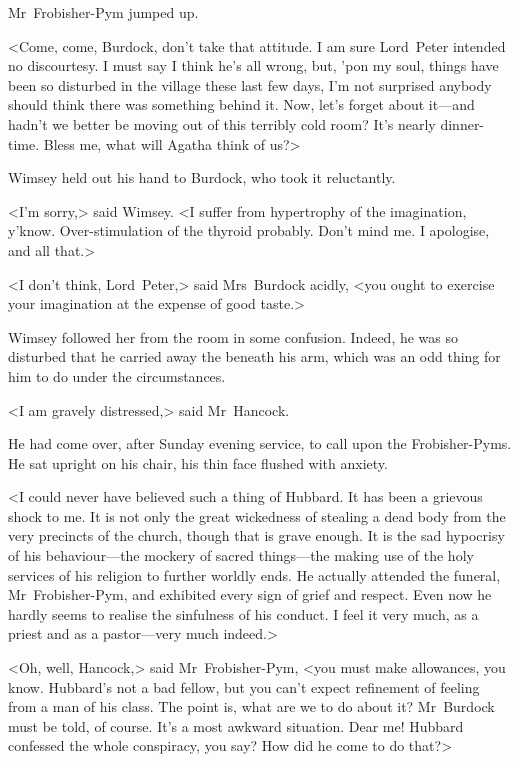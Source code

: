 Mr~Frobisher-Pym jumped up.

<Come, come, Burdock, don't take that attitude. I am sure Lord~Peter intended no discourtesy. I must say I think he's all wrong, but, 'pon my soul, things have been so disturbed in the village these last few days, I'm not surprised anybody should think there was something behind it. Now, let's forget about it—and hadn't we better be moving out of this terribly cold room? It's nearly dinner-time. Bless me, what will Agatha think of us?>

Wimsey held out his hand to Burdock, who took it reluctantly.

<I'm sorry,> said Wimsey. <I suffer from hypertrophy of the imagination, y'know. Over-stimulation of the thyroid probably. Don't mind me. I apologise, and all that.>

<I don't think, Lord~Peter,> said Mrs~Burdock acidly, <you ought to exercise your imagination at the expense of good taste.>

Wimsey followed her from the room in some confusion. Indeed, he was so disturbed that he carried away the  beneath his arm, which was an odd thing for him to do under the circumstances.

\divider
<I am gravely distressed,> said Mr~Hancock.

He had come over, after Sunday evening service, to call upon the Frobisher-Pyms. He sat upright on his chair, his thin face flushed with anxiety.

<I could never have believed such a thing of Hubbard. It has been a grievous shock to me. It is not only the great wickedness of stealing a dead body from the very precincts of the church, though that is grave enough. It is the sad hypocrisy of his behaviour—the mockery of sacred things—the making use of the holy services of his religion to further worldly ends. He actually attended the funeral, Mr~Frobisher-Pym, and exhibited every sign of grief and respect. Even now he hardly seems to realise the sinfulness of his conduct. I feel it very much, as a priest and as a pastor—very much indeed.>

<Oh, well, Hancock,> said Mr~Frobisher-Pym, <you must make allowances, you know. Hubbard's not a bad fellow, but you can't expect refinement of feeling from a man of his class. The point is, what are we to do about it? Mr~Burdock must be told, of course. It's a most awkward situation. Dear me! Hubbard confessed the whole conspiracy, you say? How did he come to do that?>

